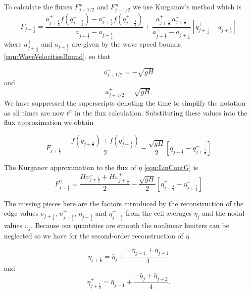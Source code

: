 To calculate the fluxes $F^{\,n} _{j+1/2}$ and $F^{\,n} _{j-1/2}$ we use Kurganov's method \cite{Kurganov-etal-2001-707} which is 
\begin{equation*}
F_{j+\frac{1}{2}} = \dfrac{a^+_{j+\frac{1}{2}} f\left(q^-_{j+\frac{1}{2}}\right) - a^-_{j+\frac{1}{2}} f\left(q^+_{j+\frac{1}{2}}\right)}{a^+_{j+\frac{1}{2}} - a^-_{j+\frac{1}{2}}}  + \dfrac{a^+_{j+\frac{1}{2}} \, a^-_{j+\frac{1}{2}}}{a^+_{j+\frac{1}{2}} - a^-_{j+\frac{1}{2}}} \left [ q^+_{j+\frac{1}{2}} - q^-_{j+\frac{1}{2}} \right ]
\end{equation*}
where $a^+_{j+\frac{1}{2}}$ and $a^-_{j+\frac{1}{2}}$ are given by the wave speed bounds \eqref{eqn:WaveVelocitiesBound}, so that 

\[a^-_{j+ 1/2} =  - \sqrt{g H}\]
and
\[a^+_{j+ 1/2} = \sqrt{g H}.\]
We have suppressed the superscripts denoting the time to simplify the notation as all times are now $t^n$ in the flux calculation. Substituting these values into the flux approximation we obtain 

\begin{equation}\label{eqn:HLL_fluxred}
F_{j+\frac{1}{2}} = \dfrac{ f\left(q^-_{j+\frac{1}{2}}\right) + f\left(q^+_{j+\frac{1}{2}}\right)}{ 2}  - \dfrac{ \sqrt{gH}}{ 2} \left [ q^+_{j+\frac{1}{2}} - q^-_{j+\frac{1}{2}} \right ]
\end{equation}

The Kurganov approximation to the flux of $\eta$ \eqref{eqn:LinContG} is
\begin{equation}
\label{eqn:HLL_fluxeta}
F^{\eta}_{j+\frac{1}{2}} = \dfrac{ H \upsilon ^-_{j+\frac{1}{2}}+ H \upsilon ^+_{j+\frac{1}{2}}}{ 2}  - \dfrac{ \sqrt{gH}}{ 2} \left [ \eta^+_{j+\frac{1}{2}} - \eta^-_{j+\frac{1}{2}} \right ]
\end{equation}

The missing pieces here are the factors introduced by the reconstruction of the edge values $\upsilon ^-_{j+\frac{1}{2}}$, $\upsilon ^+_{j+\frac{1}{2}}$, $\eta ^-_{j+\frac{1}{2}}$ and $\eta ^+_{j+\frac{1}{2}}$ from the cell averages $\bar{\eta}_j$ and the nodal values ${\upsilon}_j$. Because our quantities are smooth the nonlinear limiters can be neglected so we have for the second-order reconstruction of $\eta$ 

\begin{equation*}
\eta^-_{j+\frac{1}{2}} = \bar{\eta}_j + \frac{- \bar{\eta}_{j - 1} + \bar{\eta}_{j+ 1} }{4}
\end{equation*}
and
\begin{equation*}
\eta^+_{j+\frac{1}{2}} = \bar{\eta}_{j+1} + \frac{- \bar{\eta}_{j} + \bar{\eta}_{j+ 2}}{4}.
\end{equation*}
	
